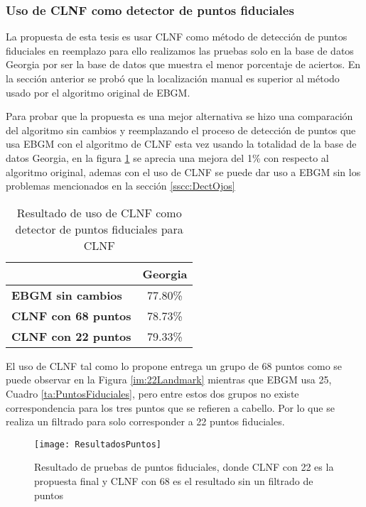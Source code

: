 \subsubsection{Uso de \ac{CLNF} como detector de puntos fiduciales}
La propuesta de esta tesis es usar \ac{CLNF} como método de detección de puntos fiduciales en reemplazo para ello realizamos las pruebas solo en la base de datos Georgia por ser la base de datos que muestra el menor porcentaje de aciertos. En la sección anterior se probó que la localización manual es superior al método usado por el algoritmo original de \ac{EBGM}.

Para probar que la propuesta es una mejor alternativa se hizo una comparación del algoritmo sin cambios y reemplazando el proceso de detección de puntos que usa \ac{EBGM} con el algoritmo de \ac{CLNF} esta vez usando la totalidad de la base de datos Georgia, en la figura \ref{im:ResultadosPuntos} se aprecia una mejora del 1\% con respecto al algoritmo original, ademas con el uso de \ac{CLNF} se puede dar uso a \ac{EBGM} sin los problemas mencionados en la sección \ref{sscc:DectOjos} 

\begin{table}[h]
\centering
\caption{Resultado de uso de \ac{CLNF} como detector de puntos fiduciales para \ac{CLNF}}
\label{ta:ResultadosPuntos}
\begin{tabular}{|l|c|}
\hline
\textbf{}                   & \textbf{Georgia} \\ \hline
\textbf{EBGM sin cambios}   & 77.80\%          \\ \hline
\textbf{CLNF con 68 puntos} & 78.73\%          \\ \hline
\textbf{CLNF con 22 puntos} & 79.33\%          \\ \hline
\end{tabular}
\end{table}


El uso de \ac{CLNF} tal como lo propone \cite{baltrusaitis2013constrained} entrega un grupo de 68 puntos como se puede observar en la Figura \ref{im:22Landmark} mientras que \ac{EBGM} usa 25, Cuadro \ref{ta:PuntosFiduciales}, pero entre estos dos grupos no existe correspondencia para los tres puntos que se refieren a cabello. Por lo que se realiza un filtrado para solo corresponder a 22 puntos fiduciales.

\begin{figure}[h]
    \centering
    \texttt{[image: ResultadosPuntos]}
    \caption{Resultado de pruebas de puntos fiduciales, donde \ac{CLNF} con 22 es la propuesta final y \ac{CLNF} con 68 es el resultado sin un filtrado de puntos}
    \label{im:ResultadosPuntos}
\end{figure}

